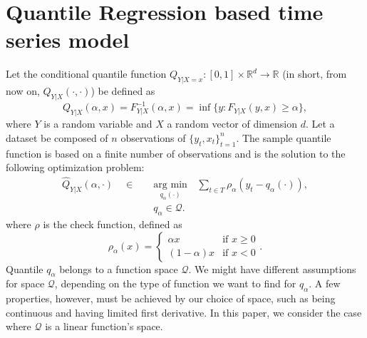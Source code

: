 \section{Quantile Regression based time series model}

Let the conditional quantile function $Q_{Y|X=x}:[0,1] \times \mathbb{R}^d \rightarrow \mathbb{R}$ (in short, from now on, $Q_{Y|X}(\cdot, \cdot)$) be defined as 
\begin{equation}
Q_{Y|X}(\alpha,x) = F_{Y|X}^{-1}(\alpha,x) = \inf\{y: F_{Y|X}(y,x) \geq \alpha\},
\label{eq:quantile-function}
\end{equation}
where $Y$ is a random variable and $X$ a random vector of dimension $d$. 
Let a dataset be composed of $n$ observations of $\{y_t,x_t \}_{t=1}^n$. The sample quantile function is based on a finite number of observations and is the solution to the following optimization problem:
\begin{eqnarray}
\hat{Q}_{Y|X}(\alpha,\cdot)\quad\in\quad & \underset{q_{\alpha}(\cdot)}{\text{arg min}}\, & \sum_{t\in T}\rho_{\alpha}(y_{t}-q_{\alpha}(\cdot)),\label{eq:optim-lqr1} \\
 & q_{\alpha}\in\mathcal{Q}.\label{eq:optim-lqr2}
\end{eqnarray}
where $\rho$ is the check function, defined as
\begin{equation}\label{eq:check-function}
\rho_{\alpha}(x)=\begin{cases}
\alpha x & \text{if }x\geq0\\
(1-\alpha)x & \text{if }x<0
\end{cases}.
\end{equation}
Quantile $q_\alpha$ belongs to a function space $\mathcal{Q}$. We might have different assumptions for space $\mathcal{Q}$, depending on the type of function we want to find for $q_\alpha$. A few properties, however, must be achieved by our choice of space, such as being continuous and having limited first derivative. In this paper, we consider the case where $\mathcal{Q}$ is a linear function's space.


